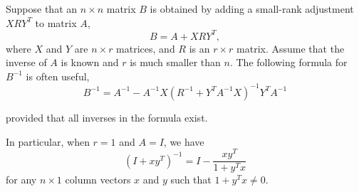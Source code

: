 \documentclass[12pt]{article}
\begin{document}
Suppose that an $n\times n$ matrix $B$ is obtained by adding a
small-rank adjustment $XRY^T$ to matrix $A$,
\[
 B = A+XRY^T,
\]
where $X$ and $Y$ are $n\times r$ matrices, and $R$ is an $r\times
r$ matrix. Assume that the inverse of $A$ is known and $r$ is much
smaller than $n$. The following formula for $B^{-1}$ is often
useful,
\[
 B^{-1} = A^{-1} - A^{-1}X (R^{-1}+Y^TA^{-1}X)^{-1} Y^T A^{-1}
\]

provided that all inverses in the formula exist.

In particular, when $r=1$ and $A=I$, we have
\[
 (I+xy^T)^{-1} = I- \frac{xy^T}{1+y^Tx}
\]
for any $n\times 1$ column vectors $x$ and $y$ such that $1+y^Tx\neq
0$.
\end{document}
